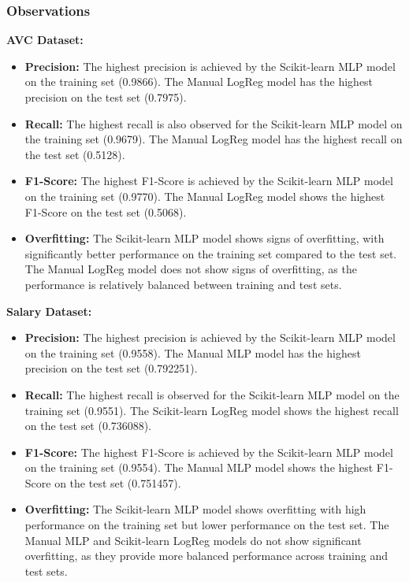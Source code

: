 \documentclass[a4paper,12pt]{article}
\begin{document}
\subsubsection{Observations}

\textbf{AVC Dataset:}
\begin{itemize}
    \item \textbf{Precision:} The highest precision is achieved by the Scikit-learn MLP model on the training set (0.9866). The Manual LogReg model has the highest precision on the test set (0.7975).
    \item \textbf{Recall:} The highest recall is also observed for the Scikit-learn MLP model on the training set (0.9679). The Manual LogReg model has the highest recall on the test set (0.5128).
    \item \textbf{F1-Score:} The highest F1-Score is achieved by the Scikit-learn MLP model on the training set (0.9770). The Manual LogReg model shows the highest F1-Score on the test set (0.5068).
    \item \textbf{Overfitting:} The Scikit-learn MLP model shows signs of overfitting, with significantly better performance on the training set compared to the test set. The Manual LogReg model does not show signs of overfitting, as the performance is relatively balanced between training and test sets.
\end{itemize}

\textbf{Salary Dataset:}
\begin{itemize}
    \item \textbf{Precision:} The highest precision is achieved by the Scikit-learn MLP model on the training set (0.9558). The Manual MLP model has the highest precision on the test set (0.792251).
    \item \textbf{Recall:} The highest recall is observed for the Scikit-learn MLP model on the training set (0.9551). The Scikit-learn LogReg model shows the highest recall on the test set (0.736088).
    \item \textbf{F1-Score:} The highest F1-Score is achieved by the Scikit-learn MLP model on the training set (0.9554). The Manual MLP model shows the highest F1-Score on the test set (0.751457).
    \item \textbf{Overfitting:} The Scikit-learn MLP model shows overfitting with high performance on the training set but lower performance on the test set. The Manual MLP and Scikit-learn LogReg models do not show significant overfitting, as they provide more balanced performance across training and test sets.
\end{itemize}
\end{document}

